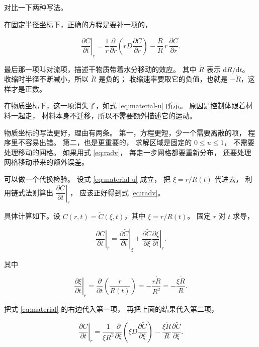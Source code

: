 对比一下两种写法。

在固定半径坐标下，正确的方程是要补一项的，

\begin{equation}
\left.\frac{\partial C}{\partial t}\right|_r
= \frac{1}{r}\frac{\partial}{\partial r}\left(rD\frac{\partial C}{\partial r}\right)
- \frac{\dot R}{R}\,r\,\frac{\partial C}{\partial r}.
\label{eq:radv}
\end{equation}

最后那一项叫对流项，描述干物质带着水分移动的效应。
其中 $\dot R$ 表示 $\mathrm{d}R/\mathrm{d}t$。
收缩时半径不断减小，所以 $\dot R$ 是负的；
收缩速率要取它的负值，也就是 $-\dot R$，这样才是正数。

在物质坐标下，这一项消失了，如式 \eqref{eq:material-u} 所示。
原因是控制体跟着材料一起走，
材料本身不迁移，所以不需要额外描述它的运动。

物质坐标的写法更好，理由有两条。
第一，方程更短，少一个需要离散的项，
程序里不容易出错。
第二，也是更重要的，
求解区域是固定的 $0\le u\le1$，
不需要处理移动的网格。
如果用式 \eqref{eq:radv}，
每走一步网格都要重新分布，
还要处理网格移动带来的额外误差。

可以做一个代换检验。
设式 \eqref{eq:material-u} 成立，
把 $\xi=r/R(t)$ 代进去，
利用链式法则算出 $\left.\dfrac{\partial C}{\partial t}\right|_r$，
应该正好得到式 \eqref{eq:radv}。

具体计算如下。设 $C(r,t)=\tilde C(\xi,t)$，其中 $\xi=r/R(t)$。
固定 $r$ 对 $t$ 求导，

\begin{equation}
\left.\frac{\partial C}{\partial t}\right|_r
= \left.\frac{\partial \tilde C}{\partial t}\right|_\xi
+ \frac{\partial \tilde C}{\partial \xi}\left.\frac{\partial \xi}{\partial t}\right|_r .
\end{equation}

其中

\begin{equation}
\left.\frac{\partial \xi}{\partial t}\right|_r
= \frac{\partial}{\partial t}\left(\frac{r}{R(t)}\right)
= -\frac{r\dot R}{R^2} = -\frac{\xi\dot R}{R}.
\end{equation}

把式 \eqref{eq:material} 的右边代入第一项，
再把上面的结果代入第二项，

\begin{equation}
\left.\frac{\partial C}{\partial t}\right|_r
= \frac{1}{\xi R^2}\frac{\partial}{\partial \xi}\left(\xi D\frac{\partial \tilde C}{\partial \xi}\right)
- \frac{\xi\dot R}{R}\frac{\partial \tilde C}{\partial \xi}.
\end{equation}

